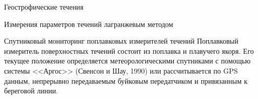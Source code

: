 \begin{chapter}{Геострофические течения}
\begin{section}{Измерения параметров течений лагранжевым методом}
\begin{paragraph}{Спутниковый мониторинг поплавковых измерителей течений}
Поплавковый измеритель поверхностных течений состоит из поплавка и
плавучего якоря. Его текущее положение определяется метеорологическими
спутниками с помощью системы <<Аргос>> (Свенсон и Шау, 1990) или
рассчитывается по GPS данным, непрерывно передаваемым буйковым
передатчиком и привязанным к береговой линии.
%


\end{paragraph}
\end{section}
\end{chapter}
